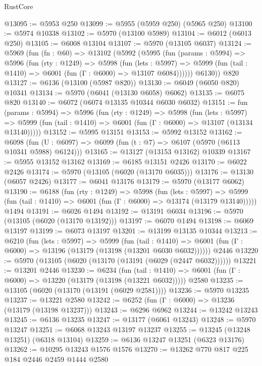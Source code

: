 \begin{lexlean}{RustCore}
\begin{coremodule}
@13095 := @5953 @250
@13099 := @5955 (@5959 @250) (@5965 @250)
@13100 := @5974 @10338
@13102 := @5970 (@13100 @5989)
@13104 := @6012 (@6013 @250)
@13105 := @6008 @13104
@13107 := @5970 (@13105 @6037)
@13124 := @5969
    (fun (fn : @60) =>
    @13102
      (@5992
        (@5995
          (fun (params : @5994) =>
          @5996
            (fun (rty : @1249) =>
            @5998
              (fun (lets : @5997) =>
              @5999 (fun (tail : @1410) => @6001 (fun (Γ : @6000) => @13107 @6084))))))
        @6130))
    @820
@13127 := @6136 (@13100 (@5987 @820))
@13130 := @6049 (@6050 @820) @10341
@13134 := @5970 (@6041 (@13130 @6058) @6062)
@13135 := @6075 @820
@13140 := @6072 (@6074 @13135 @10344 @6030 @6032)
@13151 := fun (params : @5994) =>
  @5996
    (fun (rty : @1249) =>
    @5998
      (fun (lets : @5997) =>
      @5999 (fun (tail : @1410) => @6001 (fun (Γ : @6000) => @13107 (@13134 @13140)))))
@13152 := @5995 @13151
@13153 := @5992 @13152
@13162 := @6098
    (fun (U : @6097) => @6099 (fun (t : @7) => @6107 (@5970 (@6113 @10341 @5988) @6124)))
@13165 := @13127 (@13153 @13162) @10339
@13167 := @5955 @13152 @13162
@13169 := @6185 @13151 @2426
@13170 := @6022 @2426
@13174 := @5970 (@13105 (@6020 (@13170 @6035)))
@13176 := @13130 (@6057 @2426)
@13177 := @6041 @13176
@13179 := @5970 (@13177 @6062)
@13190 := @6188
    (fun (rty : @1249) =>
    @5998
      (fun (lets : @5997) =>
      @5999 (fun (tail : @1410) => @6001 (fun (Γ : @6000) => @13174 (@13179 @13140)))))
    @1494
@13191 := @6026 @1494
@13192 := @13191 @6034
@13196 := @5970 (@13105 (@6020 (@13170 @13192)))
@13197 := @6070 @1494
@13198 := @6069 @13197
@13199 := @6073 @13197
@13201 := @13199 @13135 @10344
@13213 := @6210
    (fun (lets : @5997) =>
    @5999
      (fun (tail : @1410) =>
      @6001 (fun (Γ : @6000) => @13196 (@13179 (@13198 (@13201 @6030 @6032))))))
    @2446
@13220 := @5970 (@13105 (@6020 (@13170 (@13191 (@6029 (@2447 @6032))))))
@13221 := @13201 @2446
@13230 := @6234
    (fun (tail : @1410) => @6001 (fun (Γ : @6000) => @13220 (@13179 (@13198 (@13221 @6032)))))
    @2580
@13235 := @13105 (@6020 (@13170 (@13191 (@6029 @2581))))
@13236 := @5970 @13235
@13237 := @13221 @2580
@13242 := @6252 (fun (Γ : @6000) => @13236 (@13179 (@13198 @13237)))
@13243 := @6296 @6962
@13244 := @13242 @13243
@13245 := @6136 @13235
@13247 := @13177 (@6061 @13243)
@13248 := @5970 @13247
@13251 := @6068 @13243 @13197 @13237
@13255 := @13245 (@13248 @13251) (@6318 @13104)
@13259 := @6136 @13247 @13251 (@6323 @13176)
@13262 := @10295 @13243 @1576 @1576
@13270 := @13262 @770 @817 @225 @184 @2446 @2459 @1444 @2580

\end{coremodule}
\end{lexlean}
